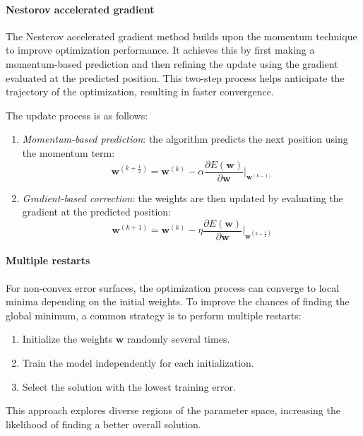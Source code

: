 \paragraph*{Nestorov accelerated gradient}
The Nesterov accelerated gradient method builds upon the momentum technique to improve optimization performance. 
It achieves this by first making a momentum-based prediction and then refining the update using the gradient evaluated at the predicted position. 
This two-step process helps anticipate the trajectory of the optimization, resulting in faster convergence.

\noindent The update process is as follows:
\begin{enumerate}
    \item \textit{Momentum-based prediction}: the algorithm predicts the next position using the momentum term:    
        \[\mathbf{w}^{\left(k+\frac{1}{2}\right)}=\mathbf{w}^{(k)}-\alpha\dfrac{\partial E(\mathbf{w})}{\partial \mathbf{w}}\Bigg|_{\mathbf{w}^{\left(k-1\right)}}\]
    \item \textit{Gradient-based correction}: the weights are then updated by evaluating the gradient at the predicted position:
        \[\mathbf{w}^{(k+1)}=\mathbf{w}^{(k)}-\eta\dfrac{\partial E(\mathbf{w})}{\partial \mathbf{w}}\Bigg|_{\mathbf{w}^{\left(k+\frac{1}{2}\right)}}\]
\end{enumerate}

\paragraph*{Multiple restarts}
For non-convex error surfaces, the optimization process can converge to local minima depending on the initial weights. 
To improve the chances of finding the global minimum, a common strategy is to perform multiple restarts:
\begin{enumerate}
    \item Initialize the weights $\mathbf{w}$ randomly several times.
    \item Train the model independently for each initialization.
    \item Select the solution with the lowest training error.
\end{enumerate}
This approach explores diverse regions of the parameter space, increasing the likelihood of finding a better overall solution.

